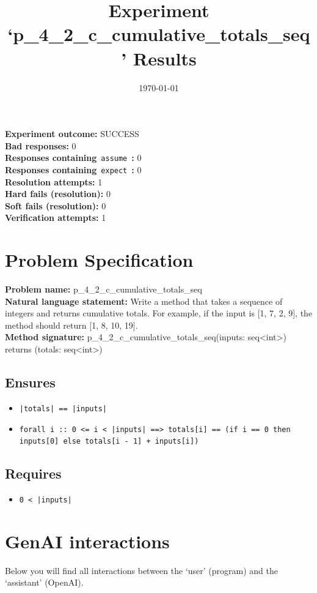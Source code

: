 \documentclass{article}
\begin{document}
\title{Experiment `p\_4\_2\_c\_cumulative\_totals\_seq' Results}
\author{\today}
\date{}
\maketitle
\textbf{Experiment outcome: }SUCCESS
\\\textbf{Bad responses: }0
\\\textbf{Responses containing}~\texttt{assume}~\textbf{: }0
\\\textbf{Responses containing}~\texttt{expect}~\textbf{: }0
\\\textbf{Resolution attempts: }1
\\\textbf{Hard fails (resolution): }0
\\\textbf{Soft fails (resolution): }0
\\\textbf{Verification attempts: }1
\section*{Problem Specification}
\textbf{Problem name: }p\_4\_2\_c\_cumulative\_totals\_seq
\\\textbf{Natural language statement: }Write a method that takes a sequence of integers and returns cumulative totals. For example, if the input is [1, 7, 2, 9], the method should return [1, 8, 10, 19].
\\\textbf{Method signature: }p\_4\_2\_c\_cumulative\_totals\_seq(inputs: seq<int>) returns (totals: seq<int>)
\subsection*{Ensures}
\begin{itemize}
\item \texttt{|totals| == |inputs|}
\item \texttt{forall i :: 0 <= i < |inputs| ==> totals[i] == (if i == 0 then inputs[0] else totals[i - 1] + inputs[i])}
\end{itemize}
\subsection*{Requires}
\begin{itemize}
\item \texttt{0 < |inputs|}
\end{itemize}
\clearpage
\section*{GenAI interactions}
Below you will find all interactions between the `user' (program) and the `assistant' (OpenAI).
\end{document}
